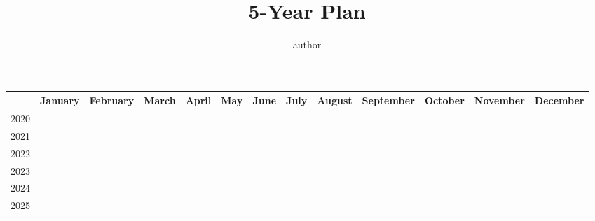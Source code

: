 \documentclass[9pt]{article}
\title{5-Year Plan}
\author{author}
\date{}
\begin{document}
\maketitle

\begin{table}[h!]
\begin{center}
\begin{tabularx}{1.1\linewidth}{|l|X|X|X|X|X|X|X|X|X|X|X|X|}
\hline
     &January&February&March&April&May&June&July&August & September & October &November &December  \\ \hline
     2020& &&&&&&&&&&& \\\hline
     2021& &&&&&&&&&&& \\\hline
     2022 & &&&&&&&&&&& \\\hline
     2023& &&&&&&&&&&& \\\hline
     2024& &&&&&&&&&&& \\\hline
     2025& &&&&&&&&&&& \\\hline
\end{tabularx}
\end{center}
\end{table}
\end{document}

